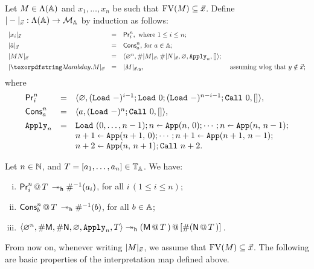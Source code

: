 \begin{defi}\label{def:categoricalint}
Let $M\in\Lama$ and $x_1,\dots,x_n$ be such that $\FV{M}\subseteq\vec x$.
Define $\CInt[\vec x]{-} : \Lama\to\cM$ by induction as follows:
\[
	\begin{array}{lcll}
	\CInt[\vec x]{x_i} &=& \mach{Pr}_i^n,\textrm{ where }1\le i \le n;\\[1ex]
	\CInt[\vec x]{\cons{a}} &=& \mach{Cons}_a^n$, for $a\in\Addrs;\\[1ex]
	\CInt[\vec x]{MN} &=& \tuple{\Null^{n},\Lookup\CInt[\vec x]{M},\Lookup\CInt[\vec x]{N},\Null,\ins{Apply}_n,[]};\\[1ex]
	\CInt[\vec x]{\lam y.M} &=& \CInt[\vec x,y]{M},&\textrm{ assuming wlog that }y\notin\vec x;\\
	\end{array}
\]
where
\[
	\begin{array}{lcl}
	\mach{Pr}_i^n &=& \tuple{\Null,(\RaS -)^{i-1};\RaS 0;(\RaS -)^{n-i-1};\Call 0,[]},\\[1ex]
	\mach{Cons}_a^n &=& \tuple{a,(\RaS -)^{n};\Call 0,[]},\\	[1ex]
	\ins{Apply}_n &=& \RaS (0,\dots,n-1);
					\Apply n 0 n;\cdots;\Apply n {n-1} n;\\
					&&\Apply {n+1} 0 {n+1};\cdots;\Apply {n+1} {n-1} {n+1};\\
                     &&\Apply n {n+1} {n+2};\Call {n+2}.\\
	\end{array}
\]
\end{defi}

\begin{rem}\label{rem:aux_int}
Let $n\in\nat$, and $T = [a_1,\dots,a_n]\in\Tapes$. We have:
\begin{enumerate}[(i)]
\item\label{rem:aux_int1}
	$\appT{\mach{Pr}_i^n}{T}\reddh \Lookinv{a_i}$, for all $i\,(1\le i\le n)$;
\item\label{rem:aux_int2}
	$\appT{\mach{Cons}_b^n}{T}\reddh \Lookinv{b}$, for all $b\in\Addrs$;
\item\label{rem:aux_int3}
	$\tuple{\Null^{n},\Lookup \mM,\Lookup \mN,\Null,\ins{Apply}_n,T} \reddh\append{(\appT{\mM}{T})}{\Lookup(\appT{\mN}{T})}$.
\end{enumerate}
\end{rem}

\noindent
From now on, whenever writing $\CInt{M}$, we assume that $\FV{M}\subseteq\vec x$.
The following are basic properties of the interpretation map defined above.

